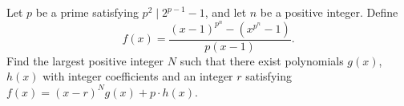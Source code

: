 Let $p$ be a prime satisfying $p^2\mid 2^{p-1}-1$, and let $n$ be a positive integer. Define
\[ f(x) = \frac{(x-1)^{p^n}-(x^{p^n}-1)}{p(x-1)}. \]
Find the largest positive integer $N$ such that there exist polynomials $g(x)$, $h(x)$ with integer coefficients and an integer $r$ satisfying $f(x) = (x-r)^N g(x) + p \cdot h(x)$.


